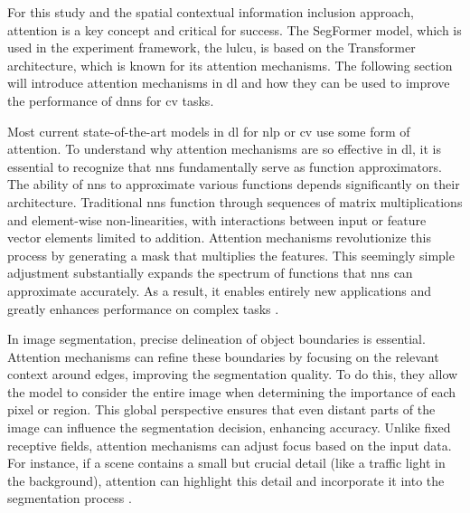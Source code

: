 For this study and the spatial contextual information inclusion approach, attention is a key concept and critical for success. The SegFormer model, which is used in the experiment framework, the \gls{lulcu}, is based on the Transformer architecture, which is known for its attention mechanisms. The following section will introduce attention mechanisms in \gls{dl} and how they can be used to improve the performance of \glspl{dnn} for \gls{cv} tasks.

Most current state-of-the-art models in \gls{dl} for \gls{nlp} or \gls{cv} use some form of attention. To understand why attention mechanisms are so effective in \gls{dl}, it is essential to recognize that \glspl{nn} fundamentally serve as function approximators. The ability of \glspl{nn} to approximate various functions depends significantly on their architecture. Traditional \glspl{nn} function through sequences of matrix multiplications and element-wise non-linearities, with interactions between input or feature vector elements limited to addition. Attention mechanisms revolutionize this process by generating a mask that multiplies the features. This seemingly simple adjustment substantially expands the spectrum of functions that \glspl{nn} can approximate accurately. As a result, it enables entirely new applications and greatly enhances performance on complex tasks \autocite{Alhichri.Alswayed.ea2021,Cordonnier.Loukas.ea2020}.

In image segmentation, precise delineation of object boundaries is essential. Attention mechanisms can refine these boundaries by focusing on the relevant context around edges, improving the segmentation quality. To do this, they allow the model to consider the entire image when determining the importance of each pixel or region. This global perspective ensures that even distant parts of the image can influence the segmentation decision, enhancing accuracy. Unlike fixed receptive fields, attention mechanisms can adjust focus based on the input data. For instance, if a scene contains a small but crucial detail (like a traffic light in the background), attention can highlight this detail and incorporate it into the segmentation process \autocite{Chen.Yang.ea2016,deSantanaCorreia.Colombini2022}.

